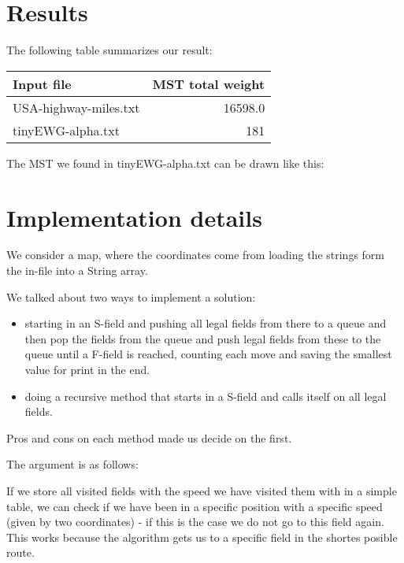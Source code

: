







  \maketitle


  \section{Results}
  
  
  
  

  The following table summarizes our result:
  
    \bigskip\noindent
  \begin{tabular}{lr}
  	\toprule
  	Input file & MST total weight \\ \midrule
  	USA-highway-miles.txt	 & 16598.0 \\
  	tinyEWG-alpha.txt & 181 \\ \bottomrule
  \end{tabular}
  
    \bigskip
  
     The MST we found in tinyEWG-alpha.txt can be drawn like this:
     
     


  
  \section{Implementation details}
  
  We consider a map, where the coordinates come from loading the strings form the in-file into a String array.

  We talked about two ways to implement a solution:
  
  \begin{itemize}
  	\item starting in an S-field and pushing all legal fields from there to a queue and then pop the fields from the queue and push legal fields from these to the queue until a F-field is reached, counting each move and saving the smallest value for print in the end.
  	\item doing a recursive method that starts in a S-field and calls itself on all legal fields.
  	
 \end{itemize}	
 
 Pros and cons on each method made us decide on the first.
 
 The argument is as follows:
 
 If we store all visited fields with the speed we have visited them with in a simple table, we can check if we have been in a specific position with a specific speed (given by two coordinates) - if this is the case we do not go to this field again. This works because the algorithm gets us to a specific field in the shortes posible route.
  
  


